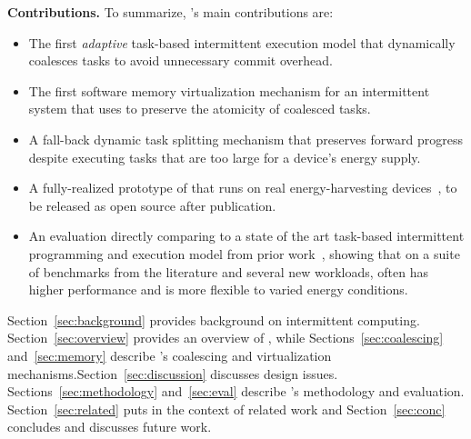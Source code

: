 %

\textbf{Contributions.} To summarize, \sys's main contributions are: 


\begin{itemize}
\item The first {\em adaptive} task-based intermittent execution model that dynamically coalesces tasks to avoid unnecessary commit overhead. 
\item The first software memory virtualization mechanism for an intermittent system that \sys uses to preserve the atomicity of coalesced tasks.
\item A fall-back dynamic task splitting mechanism that preserves forward progress despite executing tasks that are too large for a device's energy supply.
\item A fully-realized prototype of \sys that runs on real energy-harvesting devices~\cite{wisp,capy}, to be released as open source after publication. 
\item An evaluation directly comparing \sys to a state of the art task-based intermittent programming and execution model from prior work~\cite{alpaca}, showing that on a suite of benchmarks from the literature and several new workloads, \sys often has higher performance and is more flexible to varied energy conditions. 
\end{itemize}

Section~\ref{sec:background} provides background on intermittent computing.
Section~\ref{sec:overview} provides an overview of \sys, while
Sections~\ref{sec:coalescing} and~\ref{sec:memory} describe \sys's coalescing
and virtualization mechanisms.Section~\ref{sec:discussion} discusses \sys
design issues.  Sections~\ref{sec:methodology} and~\ref{sec:eval} describe
\sys's methodology and evaluation.  Section~\ref{sec:related} puts \sys in the
context of related work and Section~\ref{sec:conc} concludes and discusses
future work.